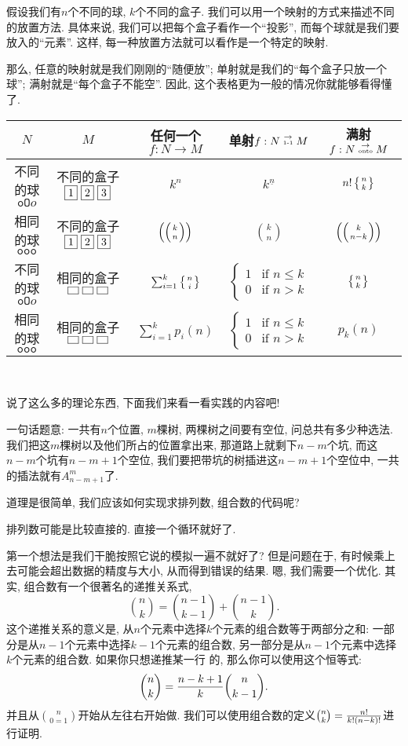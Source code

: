 假设我们有$n$个不同的球, $k$个不同的盒子. 我们可以用一个映射的方式来描述不同的放置方法. 
具体来说, 我们可以把每个盒子看作一个“投影”, 而每个球就是我们要放入的“元素”. 
这样, 每一种放置方法就可以看作是一个特定的映射. 

那么, 任意的映射就是我们刚刚的``随便放''; 单射就是我们的``每个盒子只放一个球''; 满射就是``每个盒子不能空''. 
因此, 这个表格更为一般的情况你就能够看得懂了. 

{\center \begin{tabular}[pos]{|c|c|ccc|}
  \hline
  $N$ & $M$ & 任何一个$f:N\to M$ & 单射$f:N\stackrel{\to}{\text{\tiny 1-1}} M$ & 满射$f:N\stackrel{\to}{\text{\tiny onto}} M$   \\
  \hline
  不同的球$\texttt{oO}o$ & 不同的盒子$\fbox{1}~\fbox{2}~\fbox{3}$ & $k^n$ & $k^{\underline n}$ & $n!\left\{{n \atop k}\right\}$\\
  相同的球$\texttt{ooo}$ & 不同的盒子$\fbox{1}~\fbox{2}~\fbox{3}$ & $\left(\left({k \atop n}\right)\right)$ & ${k\choose n}$ & $\left(\left({k \atop n-k}\right)\right)$\\
  不同的球$\texttt{oO}o$ & 相同的盒子$\fbox{~}~\fbox{~}~\fbox{~}$ & $\sum_{i=1}^k \left\{{n \atop i}\right\}$ & $\begin{cases}1 & \text{if }n\leq k\\ 0& \text{if }n>k\end{cases}$ & $\left\{{n \atop k}\right\}$\\
  相同的球$\texttt{ooo}$ & 相同的盒子$\fbox{~}~\fbox{~}~\fbox{~}$ & $\sum_{i=1}^k p_i(n)$ & $\begin{cases}1 & \text{if }n\leq k\\ 0& \text{if }n>k\end{cases}$ & $p_k(n)$\\
  \hline
\end{tabular}\\}

说了这么多的理论东西, 下面我们来看一看实践的内容吧! 

 一句话题意: 一共有$n$个位置, $m$棵树, 两棵树之间要有空位, 
问总共有多少种选法. 
我们把这$m$棵树以及他们所占的位置拿出来, 那道路上就剩下$n-m$个坑, 
而这$n-m$个坑有$n-m+1$个空位, 
我们要把带坑的树插进这$n-m+1$个空位中, 一共的插法就有$A_{n-m+1}^m$了.

道理是很简单, 我们应该如何实现求排列数, 组合数的代码呢? 

 排列数可能是比较直接的. 直接一个循环就好了. 

 第一个想法是我们干脆按照它说的模拟一遍不就好了? 但是问题在于, 
有时候乘上去可能会超出数据的精度与大小, 从而得到错误的结果. 嗯, 我们需要一个优化. 
其实, 组合数有一个很著名的递推关系式, 
$$\binom{n}{k} = \binom{n-1}{k-1} + \binom{n-1}{k}.$$
这个递推关系的意义是, 从$n$个元素中选择$k$个元素的组合数等于两部分之和: 一部分是从$n-1$个元素中选择$k-1$个元素的组合数, 另一部分是从$n-1$个元素中选择$k$个元素的组合数. 如果你只想递推某一行
的, 那么你可以使用这个恒等式: $${n\choose k}={n-k+1\over k}{n\choose k-1}.$$
并且从$n\choose 0=1$开始从左往右开始做. 我们可以使用组合数的定义${n\choose k}={n!\over 
k!(n-k)!}$进行证明. 

